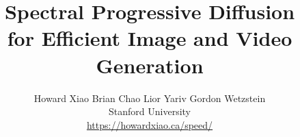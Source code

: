 \documentclass{article}
\title{Spectral Progressive Diffusion \\ for Efficient Image and Video Generation}
\begin{document}
\author{%
  Howard Xiao \quad Brian Chao \quad Lior Yariv \quad Gordon Wetzstein\vspace{1ex}\\
  Stanford University \\
  \url{https://howardxiao.ca/speed/}
}

\maketitle

\makeatletter
\let\arxiv@savedaddcontentsline\addcontentsline
\def\arxiv@tocfile{toc}
\renewcommand{\addcontentsline}[3]{%
  \def\arxiv@targetfile{#1}%
  \ifx\arxiv@targetfile\arxiv@tocfile
  \else
    \arxiv@savedaddcontentsline{#1}{#2}{#3}%
  \fi
}
\makeatother












\clearpage   %
{
\small


}




% 
\end{document}

